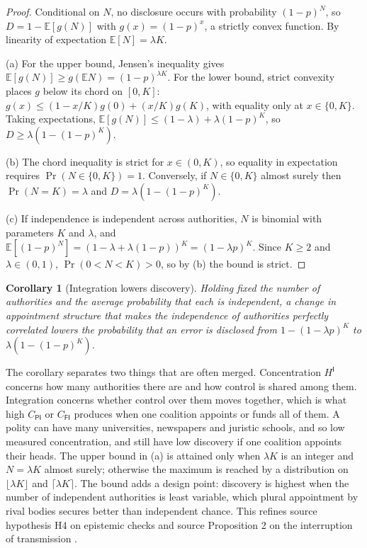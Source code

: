 \documentclass[11pt,letterpaper]{article}
\newtheorem{corollary}[theorem]{Corollary}
\theoremstyle{definition}
\theoremstyle{remark}
\newcommand{\pF}{\mathsf{F}}
\newcommand{\pP}{\mathsf{P}}
\newcommand{\pI}{\mathsf{I}}
\newcommand{\E}{\mathbb{E}}
\newcommand{\Prob}{\Pr}
\begin{document}
\begin{proof}
Conditional on $N$, no disclosure occurs with probability $(1-p)^N$, so $D=1-\E[g(N)]$ with $g(x)=(1-p)^x$, a strictly convex function. By linearity of expectation $\E[N]=\lambda K$.

(a) For the upper bound, Jensen's inequality gives $\E[g(N)]\geq g(\E N)=(1-p)^{\lambda K}$. For the lower bound, strict convexity places $g$ below its chord on $[0,K]$: $g(x)\leq(1-x/K)g(0)+(x/K)g(K)$, with equality only at $x\in\{0,K\}$. Taking expectations, $\E[g(N)]\leq(1-\lambda)+\lambda(1-p)^K$, so $D\geq\lambda(1-(1-p)^K)$.

(b) The chord inequality is strict for $x\in(0,K)$, so equality in expectation requires $\Prob(N\in\{0,K\})=1$. Conversely, if $N\in\{0,K\}$ almost surely then $\Prob(N=K)=\lambda$ and $D=\lambda(1-(1-p)^K)$.

(c) If independence is independent across authorities, $N$ is binomial with parameters $K$ and $\lambda$, and $\E[(1-p)^N]=(1-\lambda+\lambda(1-p))^K=(1-\lambda p)^K$. Since $K\geq2$ and $\lambda\in(0,1)$, $\Prob(0<N<K)>0$, so by (b) the bound is strict.
\end{proof}

\begin{corollary}[Integration lowers discovery]
\label{cor:ideological-power:integration}
Holding fixed the number of authorities and the average probability that each is independent, a change in appointment structure that makes the independence of authorities perfectly correlated lowers the probability that an error is disclosed from $1-(1-\lambda p)^K$ to $\lambda(1-(1-p)^K)$.
\end{corollary}

The corollary separates two things that are often merged. Concentration $H^{\pI}$ concerns how many authorities there are and how control is shared among them. Integration concerns whether control over them moves together, which is what high $C_{\pP\pI}$ or $C_{\pF\pI}$ produces when one coalition appoints or funds all of them. A polity can have many universities, newspapers and juristic schools, and so low measured concentration, and still have low discovery if one coalition appoints their heads. The upper bound in (a) is attained only when $\lambda K$ is an integer and $N=\lambda K$ almost surely; otherwise the maximum is reached by a distribution on $\lfloor\lambda K\rfloor$ and $\lceil\lambda K\rceil$. The bound adds a design point: discovery is highest when the number of independent authorities is least variable, which plural appointment by rival bodies secures better than independent chance. This refines source hypothesis H4 on epistemic checks and source Proposition 2 on the interruption of transmission \citep{largo2026hbs}.
\end{document}
